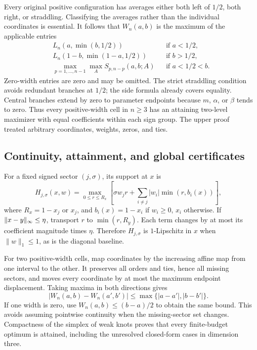 Every original positive configuration has averages either both left of $1/2$, both right, or straddling. Classifying the averages rather than the individual coordinates is essential. It follows that $W_n(a,b)$ is the maximum of the applicable entries
\begin{align*}
&L_n(a,\min(b,1/2))&&\text{if }a<1/2,\\
&L_n(1-b,\min(1-a,1/2))&&\text{if }b>1/2,\\
&\max_{p=1,\ldots,n-1}\max_A S_{p,n-p}(a,b;A)
&&\text{if }a<1/2<b.
\end{align*}
Zero-width entries are zero and may be omitted. The strict straddling condition avoids redundant branches at $1/2$; the side formula already covers equality. Central branches extend by zero to parameter endpoints because $m$, $\alpha$, or $\beta$ tends to zero. Thus every positive-width cell in $n\ge3$ has an attaining two-level maximizer with equal coefficients within each sign group. The upper proof treated arbitrary coordinates, weights, zeros, and ties.

\subsection{Continuity, attainment, and global certificates}
For a fixed signed sector $(j,\sigma)$, its support at $x$ is
\begin{equation}\label{eq:support-radius}
H_{j,\sigma}(x,w)=
\max_{0\le r\le R_x}
\left[\sigma w_jr+\sum_{i\ne j}|w_i|\min(r,b_i(x))\right],
\end{equation}
where $R_x=1-x_j$ or $x_j$, and $b_i(x)=1-x_i$ if $w_i\ge0$, $x_i$ otherwise. If $\lVert x-y\rVert_\infty\le\eta$, transport $r$ to $\min(r,R_y)$. Each term changes by at most its coefficient magnitude times $\eta$. Therefore $H_{j,\sigma}$ is $1$-Lipschitz in $x$ when $\|w\|_1\le1$, as is the diagonal baseline.

For two positive-width cells, map coordinates by the increasing affine map from one interval to the other. It preserves all orders and ties, hence all missing sectors, and moves every coordinate by at most the maximum endpoint displacement. Taking maxima in both directions gives
\begin{equation}\label{eq:cell-continuity}
|W_n(a,b)-W_n(a',b')|\le\max\{|a-a'|,|b-b'|\}.
\end{equation}
If one width is zero, use $W_n(a,b)\le(b-a)/2$ to obtain the same bound. This avoids assuming pointwise continuity when the missing-sector set changes. Compactness of the simplex of weak knots proves that every finite-budget optimum is attained, including the unresolved closed-form cases in dimension three.

